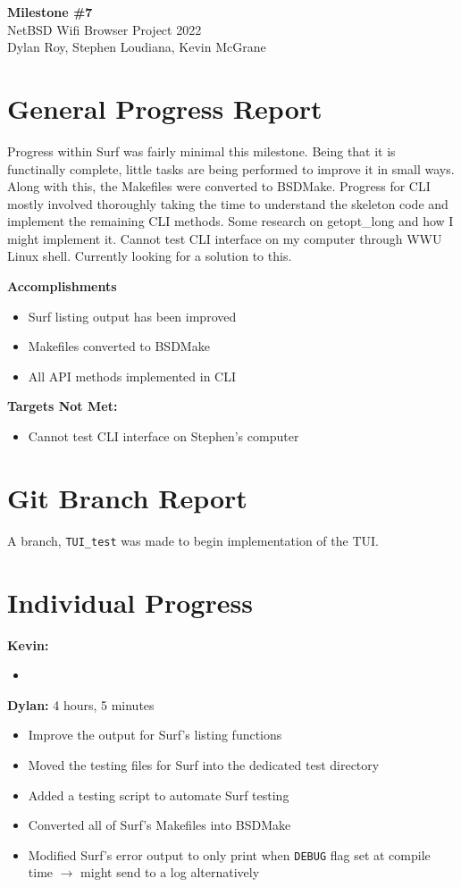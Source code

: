 \documentclass[11pt]{article}
\begin{document}
\begin{center}
  \textbf{\Large Milestone \#7}\\\large NetBSD Wifi Browser Project 2022\\
  Dylan Roy, Stephen Loudiana, Kevin McGrane
\end{center}

\section{General Progress Report}
Progress within Surf was fairly minimal this milestone. Being that it
is functinally complete, little tasks are being performed to improve
it in small ways. Along with this, the Makefiles were converted to BSDMake. 
Progress for CLI mostly involved thoroughly taking the time to understand 
the skeleton code and implement the remaining CLI methods. Some research on 
getopt_long and how I might implement it. Cannot test CLI interface on my 
computer through WWU Linux shell. Currently looking for a solution to this. 

\textbf{Accomplishments}
\begin{itemize}
  \item Surf listing output has been improved 
  \item Makefiles converted to BSDMake
  \item All API methods implemented in CLI 
\end{itemize}

\textbf{Targets Not Met:}
\begin{itemize}
  \item Cannot test CLI interface on Stephen's computer 
\end{itemize}


\section{Git Branch Report}
A branch, \texttt{TUI\_test} was made to begin implementation of the TUI.

\newpage
\section{Individual Progress}

\textbf{Kevin:}
\begin{itemize}
  \item
\end{itemize}

\textbf{Dylan:} 4 hours, 5 minutes
\begin{itemize}
  \item Improve the output for Surf's listing functions
  \item Moved the testing files for Surf into the dedicated test directory
  \item Added a testing script to automate Surf testing
  \item Converted all of Surf's Makefiles into BSDMake
  \item Modified Surf's error output to only print when \texttt{DEBUG} flag set
    at compile time $\rightarrow$ might send to a log alternatively
\end{itemize}
\end{document}
